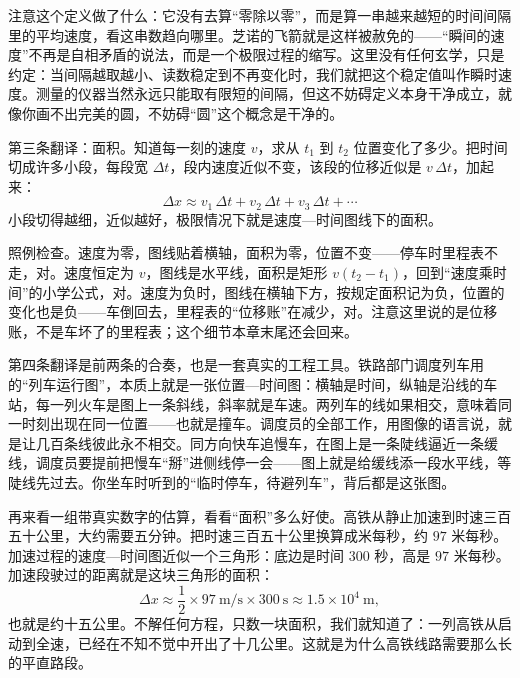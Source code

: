 注意这个定义做了什么：它没有去算“零除以零”，而是算一串越来越短的时间间隔里的平均速度，看这串数趋向哪里。芝诺的飞箭就是这样被赦免的——“瞬间的速度”不再是自相矛盾的说法，而是一个极限过程的缩写。这里没有任何玄学，只是约定：当间隔越取越小、读数稳定到不再变化时，我们就把这个稳定值叫作瞬时速度。测量的仪器当然永远只能取有限短的间隔，但这不妨碍定义本身干净成立，就像你画不出完美的圆，不妨碍“圆”这个概念是干净的。

第三条翻译：面积。知道每一刻的速度 \(v\)，求从 \(t_1\) 到 \(t_2\) 位置变化了多少。把时间切成许多小段，每段宽 \(\Delta t\)，段内速度近似不变，该段的位移近似是 \(v\,\Delta t\)，加起来：
\[
\Delta x\approx v_1\,\Delta t+v_2\,\Delta t+v_3\,\Delta t+\cdots
\]
小段切得越细，近似越好，极限情况下就是速度—时间图线下的面积。

\begin{center}
\end{center}

照例检查。速度为零，图线贴着横轴，面积为零，位置不变——停车时里程表不走，对。速度恒定为 \(v\)，图线是水平线，面积是矩形 \(v(t_2-t_1)\)，回到“速度乘时间”的小学公式，对。速度为负时，图线在横轴下方，按规定面积记为负，位置的变化也是负——车倒回去，里程表的“位移账”在减少，对。注意这里说的是位移账，不是车坏了的里程表；这个细节本章末尾还会回来。

第四条翻译是前两条的合奏，也是一套真实的工程工具。铁路部门调度列车用的“列车运行图”，本质上就是一张位置—时间图：横轴是时间，纵轴是沿线的车站，每一列火车是图上一条斜线，斜率就是车速。两列车的线如果相交，意味着同一时刻出现在同一位置——也就是撞车。调度员的全部工作，用图像的语言说，就是让几百条线彼此永不相交。同方向快车追慢车，在图上是一条陡线逼近一条缓线，调度员要提前把慢车“掰”进侧线停一会——图上就是给缓线添一段水平线，等陡线先过去。你坐车时听到的“临时停车，待避列车”，背后都是这张图。

再来看一组带真实数字的估算，看看“面积”多么好使。高铁从静止加速到时速三百五十公里，大约需要五分钟。把时速三百五十公里换算成米每秒，约 \(97\) 米每秒。加速过程的速度—时间图近似一个三角形：底边是时间 \(300\) 秒，高是 \(97\) 米每秒。加速段驶过的距离就是这块三角形的面积：
\[
\Delta x\approx\frac{1}{2}\times 97\ \text{m/s}\times 300\ \text{s}\approx 1.5\times10^{4}\ \text{m},
\]
也就是约十五公里。不解任何方程，只数一块面积，我们就知道了：一列高铁从启动到全速，已经在不知不觉中开出了十几公里。这就是为什么高铁线路需要那么长的平直路段。

